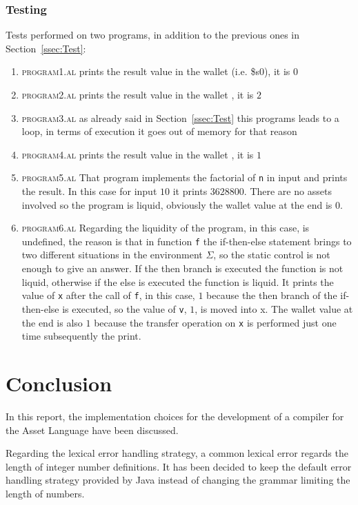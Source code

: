 \documentclass[11pt]{article} %
\begin{document}
\subsubsection{Testing}
Tests performed on two programs, in addition to the previous ones in Section~\ref{ssec:Test}:
\begin{enumerate}
\item \textsc{program1.al}
prints the result value in the wallet (i.e. \$s0), it is $0$
\item \textsc{program2.al}
prints the result value in the wallet , it is $2$
\item \textsc{program3.al}
as already said in Section~\ref{ssec:Test} this programs leads to a loop, in terms of execution it goes out of memory for that reason 
\item \textsc{program4.al}
prints the result value in the wallet , it is $1$
\item \textsc{program5.al} 
That program implements the factorial of \verb|n| in input and prints the result. In this case for input $10$ it prints $3628800$. There are no assets involved so the program is liquid, obviously the wallet value at the end is $0$.
\item \textsc{program6.al} 
Regarding the liquidity of the program, in this case, is undefined, the reason is that in function \verb|f| the if-then-else statement brings to two different situations in the environment $\Sigma$, so the static control is not enough to give an answer. If the then branch is executed the function is not liquid, otherwise if the else is executed the function is liquid. It prints the value of \verb|x| after the call of \verb|f|, in this case, $1$ because the then branch of the if-then-else is executed, so the value of \verb|v|, $1$, is moved into x. The wallet value at the end is also $1$ because the transfer operation on \verb|x| is performed just one time subsequently the print.
\end{enumerate}


\section{Conclusion}
In this report, the implementation choices for the development of a compiler for the Asset Language have been discussed.

\medskip

Regarding the lexical error handling strategy, a common lexical error regards the length of integer number definitions. It has been decided to keep the default error handling strategy provided by Java instead of changing the grammar limiting the length of numbers.
\end{document}
